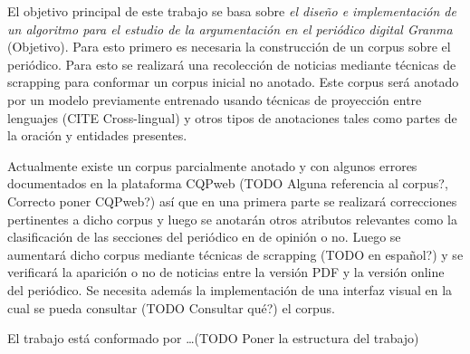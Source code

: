 El objetivo principal de este trabajo se basa sobre \emph{el diseño e implementación de un algoritmo para 
el estudio de la argumentación en el periódico digital Granma} (Objetivo). Para esto primero
es necesaria la construcción de un corpus sobre el periódico. Para esto se realizará una recolección
de noticias mediante técnicas de scrapping para conformar un corpus inicial no anotado. Este corpus
será anotado por un modelo previamente entrenado usando técnicas de proyección entre lenguajes (CITE Cross-lingual)
y otros tipos de anotaciones tales como partes de la oración y entidades presentes.

Actualmente existe un corpus parcialmente
anotado y con algunos errores documentados en la plataforma CQPweb (TODO Alguna referencia al corpus?,
Correcto poner CQPweb?) así que en una primera parte se realizará correcciones pertinentes a dicho 
corpus y luego se anotarán otros atributos relevantes como la clasificación de las secciones del 
periódico en de opinión o no. Luego se aumentará dicho corpus mediante técnicas de scrapping 
(TODO en español?) y se verificará la aparición o no de noticias entre la versión PDF y la versión 
online del periódico. Se necesita además la implementación de una interfaz visual en la cual se 
pueda consultar (TODO Consultar qué?) el corpus.


El trabajo está conformado por \dots (TODO Poner la estructura del trabajo)




